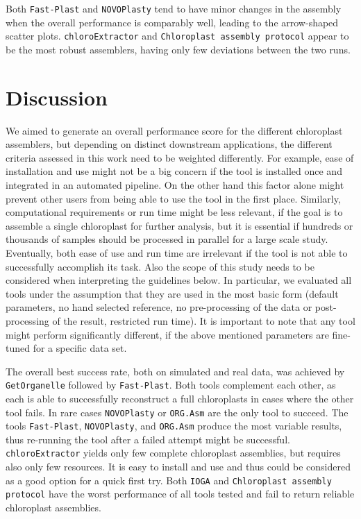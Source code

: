 \documentclass{bmcart}
\newcounter{todocounter}
\newcommand{\ak}[1]
{\stepcounter{todocounter}
 \todo[color=green!40,author=Arthur]{\thetodocounter: #1}
 }
\newcommand{\formatprogramnames}[1]{\texttt{#1}}
\newcommand{\ce}{\formatprogramnames{chloroExtractor}}
\newcommand{\oa}{\formatprogramnames{ORG.Asm}}
\newcommand{\fp}{\formatprogramnames{Fast-Plast}}
\newcommand{\ioga}{\formatprogramnames{IOGA}}
\newcommand{\np}{\formatprogramnames{NOVOPlasty}}
\newcommand{\go}{\formatprogramnames{GetOrganelle}}
\newcommand{\cassp}{\formatprogramnames{Chloroplast assembly protocol}}
\begin{document}
Both \fp{} and \np{} tend to have minor changes in the assembly when the overall performance is comparably well, leading to the arrow-shaped scatter plots.
\ce{} and \cassp{} appear to be the most robust assemblers, having only few deviations between the two runs.

\section*{Discussion}
We aimed to generate an overall performance score for the different chloroplast assemblers, but depending on distinct downstream applications, the different criteria assessed in this work need to be weighted differently.
For example, ease of installation and use might not be a big concern if the tool is installed once and integrated in an automated pipeline. On the other hand this factor alone might prevent other users from being able to use the tool in the first place.
Similarly, computational requirements or run time might be less relevant, if the goal is to assemble a single chloroplast for further analysis, but it is essential if hundreds or thousands of samples should be processed in parallel for a large scale study.
Eventually, both ease of use and run time are irrelevant if the tool is not able to successfully accomplish its task.
Also the scope of this study needs to be considered when interpreting the guidelines below.
In particular, we evaluated all tools under the assumption that they are used in the most basic form (default parameters, no hand selected reference, no pre-processing of the data or post-processing of the result, restricted run time).
It is important to note that any tool might perform significantly different, if the above mentioned parameters are fine-tuned for a specific data set.

The overall best success rate, both on simulated and real data, was achieved by \go{} followed by \fp{}.
Both tools complement each other, as each is able to successfully reconstruct a full chloroplasts in cases where the other tool fails. 
In rare cases \np{} or \oa{} are the only tool to succeed.
The tools \fp{}, \np{}, and \oa{} produce the most variable results, thus re-running the tool after a failed attempt might be successful.
\ce{} yields only few complete chloroplast assemblies, but requires also only few resources.
It is easy to install and use and thus could be considered as a good option for a quick first try.
Both \ioga{} and \cassp{} have the worst performance of all tools tested and fail to return reliable chloroplast assemblies.
\end{document}
